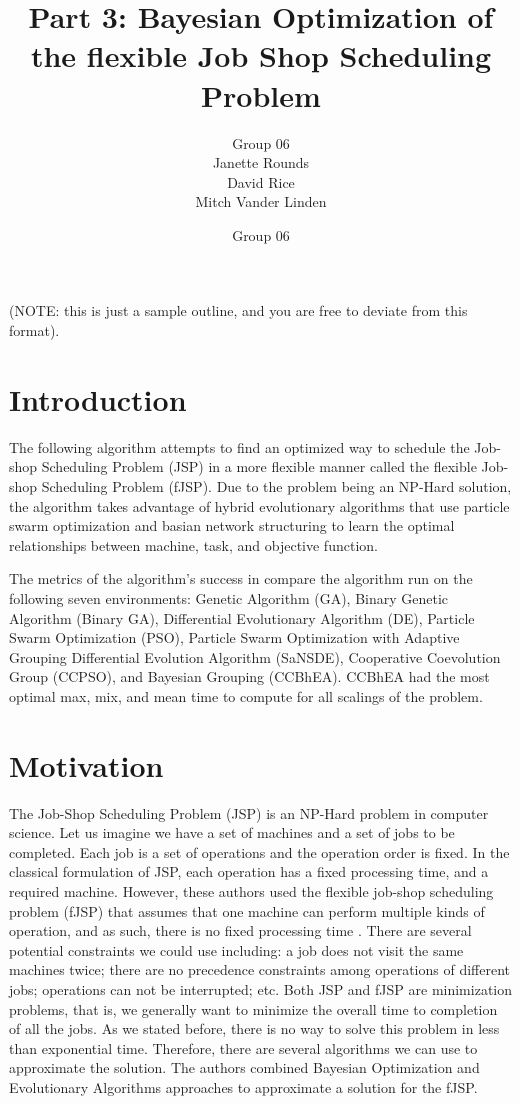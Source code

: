 \documentclass[11pt]{article}
\title{Part 3: Bayesian Optimization of the flexible Job Shop Scheduling Problem}
\author{Group 06 \\ 
\small Janette Rounds \\ \small David Rice \\ \small Mitch Vander Linden}
\author{Group 06}
\begin{document}
\maketitle

(NOTE: this is just a sample outline, and you are free to deviate from this 
format).

\section{Introduction}
The following algorithm attempts to find an optimized way to schedule the Job-shop Scheduling Problem (JSP) in a more flexible manner called the flexible Job-shop Scheduling Problem (fJSP). Due to the problem being an NP-Hard solution, the algorithm takes advantage of hybrid evolutionary algorithms that use particle swarm optimization and basian network structuring to learn the optimal relationships between machine, task, and objective function. 

The metrics of the algorithm's success in \cite{sun2015bayesian} compare the algorithm run on the following seven environments: Genetic Algorithm (GA), Binary Genetic Algorithm (Binary GA), Differential Evolutionary Algorithm (DE), Particle Swarm Optimization (PSO), Particle Swarm Optimization with Adaptive Grouping Differential Evolution Algorithm (SaNSDE), Cooperative Coevolution Group (CCPSO), and Bayesian Grouping (CCBhEA). CCBhEA had the most optimal max, mix, and mean time to compute for all scalings of the problem.

\section{Motivation}
The Job-Shop Scheduling Problem (JSP) is an NP-Hard problem in computer science\cite{cheng1996tutorial}. Let us imagine we have a set of machines and a set of jobs to be completed. Each job is a set of operations and the operation order is fixed. In the classical formulation of JSP, each operation has a fixed processing time, and a required machine. However, these authors used the flexible job-shop scheduling problem (fJSP) that assumes that one machine can perform multiple kinds of operation, and as such, there is no fixed processing time \cite{sun2015bayesian}. There are several potential constraints we could use including: a job does not visit the same machines twice; there are no precedence constraints among operations of different jobs; operations can not be interrupted; etc. Both JSP and fJSP are minimization problems, that is, we generally want to minimize the overall time to completion of all the jobs. As we stated before, there is no way to solve this problem in less than exponential time. Therefore, there are several algorithms we can use to approximate the solution. The authors combined Bayesian Optimization and Evolutionary Algorithms approaches to approximate a solution for the fJSP. 
\end{document}
